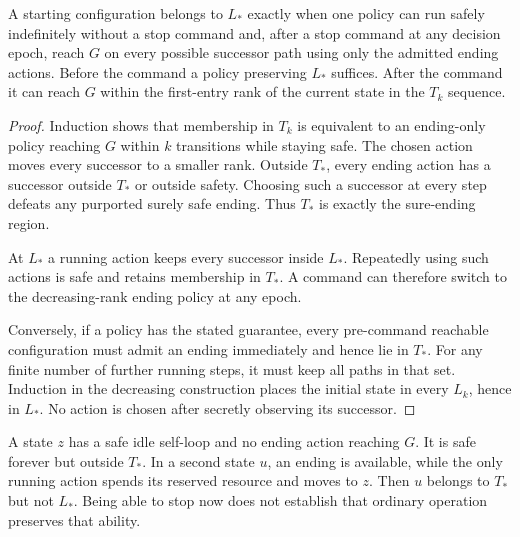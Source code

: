 \begin{Coretheorem}\label{Core:r:ending}
A starting configuration belongs to $L_*$ exactly when one policy can run safely indefinitely without a stop command and, after a stop command at any decision epoch, reach $G$ on every possible successor path using only the admitted ending actions. Before the command a policy preserving $L_*$ suffices. After the command it can reach $G$ within the first-entry rank of the current state in the $T_k$ sequence.
\end{Coretheorem}
\begin{proof}
Induction shows that membership in $T_k$ is equivalent to an ending-only policy reaching $G$ within $k$ transitions while staying safe. The chosen action moves every successor to a smaller rank. Outside $T_*$, every ending action has a successor outside $T_*$ or outside safety. Choosing such a successor at every step defeats any purported surely safe ending. Thus $T_*$ is exactly the sure-ending region.

At $L_*$ a running action keeps every successor inside $L_*$. Repeatedly using such actions is safe and retains membership in $T_*$. A command can therefore switch to the decreasing-rank ending policy at any epoch.

Conversely, if a policy has the stated guarantee, every pre-command reachable configuration must admit an ending immediately and hence lie in $T_*$. For any finite number of further running steps, it must keep all paths in that set. Induction in the decreasing construction places the initial state in every $L_k$, hence in $L_*$. No action is chosen after secretly observing its successor.
\end{proof}

\begin{Corecounterexample}\label{Core:ce:ending}
A state $z$ has a safe idle self-loop and no ending action reaching $G$. It is safe forever but outside $T_*$. In a second state $u$, an ending is available, while the only running action spends its reserved resource and moves to $z$. Then $u$ belongs to $T_*$ but not $L_*$. Being able to stop now does not establish that ordinary operation preserves that ability.
\end{Corecounterexample}

